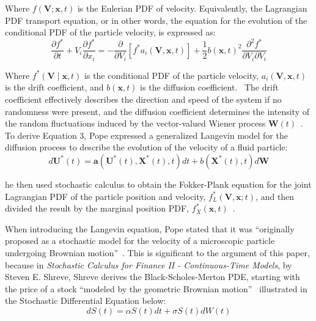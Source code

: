 \documentclass[12pt, onecolumn, journal]{IEEEtran}
\begin{document}
\noindent Where $f(\mathbf{V}; \mathbf{x}, t)$ is the Eulerian PDF of velocity. Equivalently, the Lagrangian PDF transport equation, or in other words, the equation for the evolution of the conditional PDF of the particle velocity, is expressed as:
\begin{equation}
\frac{\partial f^*}{\partial t} + V_i \frac{\partial f^*}{\partial x_i} = - \frac{\partial}{\partial V_i} \left[f^* a_i(\mathbf{V}, \mathbf{x}, t)\right] + \frac{1}{2} b{\left(\mathbf{x}, t\right)}^2 \frac{\partial^2 f^*}{\partial V_i \partial V_i}
\end{equation}

\noindent Where $f^*\left(\mathbf{V} \middle| \mathbf{x}, t\right)$ is the conditional PDF of the particle velocity, $a_i(\mathbf{V}, \mathbf{x}, t)$ is the drift coefficient, and $b(\mathbf{x}, t)$ is the diffusion coefficient.~\cite{Pope2000} The drift coefficient effectively describes the direction and speed of the system if no randomness were present, and the diffusion coefficient determines the intensity of the random fluctuations induced by the vector-valued Wiener process $\mathbf{W}(t)$~\cite{Pope2000}. To derive Equation 3, Pope expressed a generalized Langevin model for the diffusion process to describe the evolution of the velocity of a fluid particle:
\begin{equation}
d \mathbf{U^*}(t) = \mathbf{a}(\mathbf{U^*}(t), \mathbf{X^*}(t), t) dt + b(\mathbf{X^*}(t), t) d \mathbf{W}
\end{equation}

he then used stochastic calculus to obtain the Fokker-Plank equation for the joint Lagrangian PDF of the particle position and velocity, $f^{*}_L(\mathbf{V}, \mathbf{x}; t)$, and then divided the result by the marginal position PDF, $f^{*}_X (\mathbf{x}, t)$~\cite{Pope2000}. 

When introducing the Langevin equation, Pope stated that it was “originally proposed as a stochastic model for the velocity of a microscopic particle undergoing Brownian motion”~\cite{Pope2000}. This is significant to the argument of this paper, because in \textit{Stochastic Calculus for Finance II - Continuous-Time Models}, by Steven E. Shreve, Shreve derives the Black-Scholes-Merton PDE, starting with the price of a stock “modeled by the geometric Brownian motion”~\cite{Shreve2004} illustrated in the Stochastic Differential Equation below:
\begin{equation}
dS(t) = \alpha S(t) dt + \sigma S(t) dW(t)
\end{equation}
\end{document}
